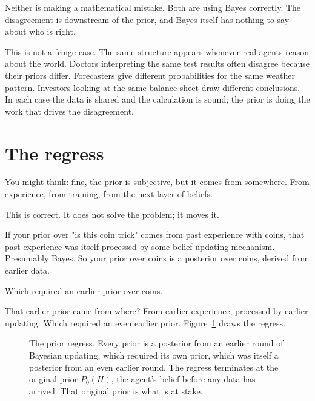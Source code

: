 Neither is making a mathematical mistake. Both are using Bayes correctly. The disagreement is downstream of the prior, and Bayes itself has nothing to say about who is right.

This is not a fringe case. The same structure appears whenever real agents reason about the world. Doctors interpreting the same test results often disagree because their priors differ. Forecasters give different probabilities for the same weather pattern. Investors looking at the same balance sheet draw different conclusions. In each case the data is shared and the calculation is sound; the prior is doing the work that drives the disagreement.

\section*{The regress}

You might think: fine, the prior is subjective, but it comes from somewhere. From experience, from training, from the next layer of beliefs.

This is correct. It does not solve the problem; it moves it.

If your prior over "is this coin trick" comes from past experience with coins, that past experience was itself processed by some belief-updating mechanism. Presumably Bayes. So your prior over coins is a posterior over coins, derived from earlier data.

Which required an earlier prior over coins.

That earlier prior came from where? From earlier experience, processed by earlier updating. Which required an even earlier prior. Figure~\ref{fig:prior-regress} draws the regress.

\begin{figure}[h]
\centering
{}
\caption{The prior regress. Every prior is a posterior from an earlier round of Bayesian updating, which required its own prior, which was itself a posterior from an even earlier round. The regress terminates at the original prior $P_0(H)$, the agent's belief before any data has arrived. That original prior is what is at stake.}
\label{fig:prior-regress}
\end{figure}

